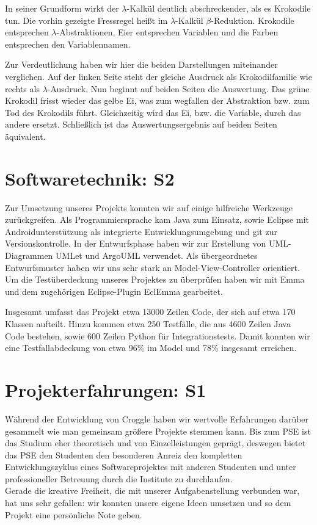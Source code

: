 \documentclass{scrartcl}
\begin{document}
	In seiner Grundform wirkt der $\lambda$-Kalkül deutlich abschreckender, als es Krokodile tun.
	Die vorhin gezeigte Fressregel heißt im $\lambda$-Kalkül $\beta$-Reduktion.
	Krokodile entsprechen $\lambda$-Abstraktionen, Eier entsprechen Variablen und die Farben entsprechen den Variablennamen.

	Zur Verdeutlichung haben wir hier die beiden Darstellungen miteinander verglichen.
	Auf der linken Seite steht der gleiche Ausdruck als Krokodilfamilie wie rechts als $\lambda$-Ausdruck.
	Nun beginnt auf beiden Seiten die Auswertung.
	Das grüne Krokodil frisst wieder das gelbe Ei, was zum wegfallen der Abstraktion bzw. zum Tod des Krokodils führt.
	Gleichzeitig wird das Ei, bzw. die Variable, durch das andere ersetzt.
	Schließlich ist das Auswertungsergebnis auf beiden Seiten äquivalent.

	\section{Softwaretechnik: S2}
	Zur Umsetzung unseres Projekts konnten wir auf einige hilfreiche Werkzeuge zurückgreifen.
	Als Programmiersprache kam Java zum Einsatz, sowie Eclipse mit Androidunterstützung als integrierte Entwicklungsumgebung und git zur Versionskontrolle.
	In der Entwurfsphase haben wir zur Erstellung von UML-Diagrammen UMLet und ArgoUML verwendet.
	Als übergeordnetes Entwurfsmuster haben wir uns sehr stark an Model-View-Controller orientiert.
	Um die Testüberdeckung unseres Projektes zu überprüfen haben wir mit Emma und dem zugehörigen Eclipse-Plugin EclEmma gearbeitet.

	Insgesamt umfasst das Projekt etwa 13000 Zeilen Code, der sich auf etwa 170 Klassen aufteilt.
	Hinzu kommen etwa 250 Testfälle, die aus 4600 Zeilen Java Code bestehen, sowie 600 Zeilen Python für Integrationstests.
	Damit konnten wir eine Testfallabdeckung von etwa 96\% im Model und 78\% insgesamt erreichen.

	\section{Projekterfahrungen: S1}

	Während der Entwicklung von Croggle haben wir wertvolle Erfahrungen darüber gesammelt wie man gemeinsam größere Projekte stemmen kann. Bis zum PSE ist das Studium eher theoretisch und von Einzelleistungen geprägt, deswegen bietet das PSE den Studenten den besonderen Anreiz den kompletten Entwicklungszyklus eines Softwareprojektes mit anderen Studenten und unter professioneller Betreuung durch die Institute zu durchlaufen. \\
	Gerade die kreative Freiheit, die mit unserer Aufgabenstellung verbunden war, hat uns sehr gefallen: wir konnten unsere eigene Ideen umsetzen und so dem Projekt eine persönliche Note geben. \\
\end{document}

